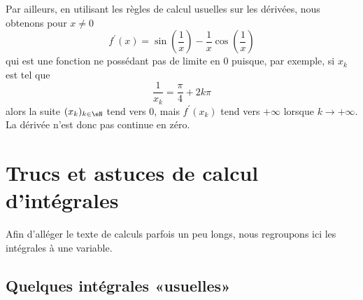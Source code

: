\begin{example}
\begin{enumerate}
		      Par ailleurs, en utilisant les règles de calcul usuelles sur les
		      dérivées, nous obtenons pour $x \neq 0$
		      \begin{equation*}
			      f^\prime(x) = \sin
			      \left(
			      \frac 1 x
			      \right) - \frac 1 x \cos
			      \left(
			      \frac 1 x
			      \right)
		      \end{equation*}
		      qui est une fonction ne possédant pas de limite en $0$ puisque, par exemple,
		      si $x_k$ est tel que
		      \begin{equation*}
			      \frac 1{x_k} = \frac\pi4 + 2k\pi
		      \end{equation*}
		      alors la suite $(x_k)_{k\in\eN}$ tend vers $0$, mais $f^\prime(x_k)$ tend vers $+\infty$ lorsque $k \rightarrow +\infty$. La dérivée n'est donc pas continue en zéro.
	\end{enumerate}
\end{example}

\section{Trucs et astuces de calcul d'intégrales}
\label{SECooKSOFooEVKDLh}

Afin d'alléger le texte de calculs parfois un peu longs, nous regroupons ici les intégrales à une variable.

\subsection{Quelques intégrales «usuelles»}

